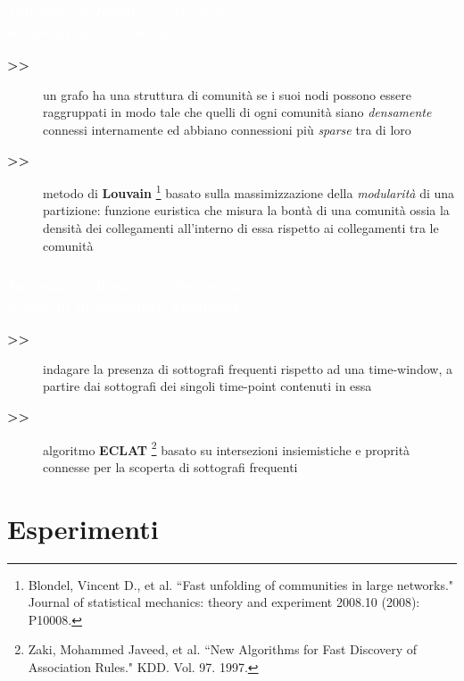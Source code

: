 \documentclass[11pt,xcolor={usenames,dvipsnames,svgnames},compress]{beamer}
\newcommand{\highlighttext}[2][yellow]{{\colorbox{#1}{\textcolor{white}{#2}}}}
\begin{document}
\begin{frame}
\frametitle{\highlighttext[peas3]{\textbf{\emph{Interazioni Basate su Densit{\`a}:}}} \\ \highlighttext[peas3]{\textbf{\emph{Scoperta di Comunit{\`a}}}}}
  
   \begin{description}
  \item[\textbf{>>}] un grafo ha una struttura di comunit{\`a} se i suoi nodi possono essere raggruppati in modo tale che quelli di ogni comunit{\`a} siano \textit{densamente} connessi internamente ed abbiano connessioni pi{\`u} \textit{sparse} tra di loro
  \item[\textbf{>>}] metodo di \textbf{Louvain} \footnote{Blondel, Vincent D., et al. ``Fast unfolding of communities in large networks." Journal of statistical mechanics: theory and experiment 2008.10 (2008): P10008.} basato sulla massimizzazione della \textit{modularit{\`a}} di una partizione: funzione euristica che misura la bont{\`a} di una comunit{\`a} ossia la densit{\`a} dei collegamenti all'interno di essa rispetto ai collegamenti tra le comunit{\`a}
  \end{description}\bigskip
  
\end{frame}

\begin{frame}
  \frametitle{\highlighttext[peas3]{\textbf{\emph{Interazioni Basate su Frequenza:}}} \\ \highlighttext[peas3]{\textbf{\emph{Scoperta di Sottografi Frequenti}}}}

\begin{description}
  \item[\textbf{>>}] indagare la presenza di sottografi frequenti rispetto ad una time-window, a partire dai sottografi dei singoli time-point contenuti in essa
  \item[\textbf{>>}] algoritmo \textbf{ECLAT} \footnote{Zaki, Mohammed Javeed, et al. ``New Algorithms for Fast Discovery of Association Rules." KDD. Vol. 97. 1997.} basato su intersezioni insiemistiche e proprit{\`a} connesse per la scoperta di sottografi frequenti
  \end{description}\bigskip  
  
\end{frame}  
   
\section{Esperimenti}
{
  \begin{frame}
    \sectionpage
  \end{frame}
}   
\end{document}
